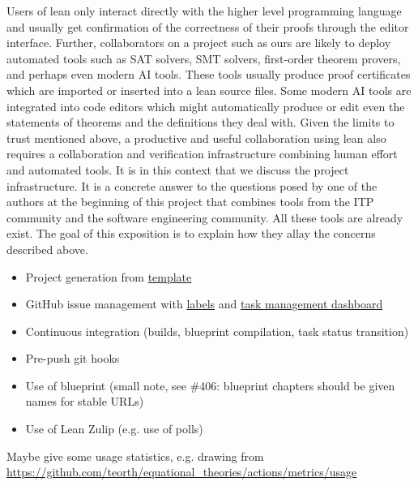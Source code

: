 Users of lean only interact directly with the higher level programming language and usually get confirmation of the correctness of their proofs through the editor interface. Further, collaborators on a project such as ours are likely to deploy automated tools such as SAT solvers, SMT solvers, first-order theorem provers, and perhaps even modern AI tools. These tools usually produce proof certificates which are imported or inserted into a lean source files. Some modern AI tools are integrated into code editors which might automatically produce or edit even the statements of theorems and the definitions they deal with. Given the limits to trust mentioned above, a productive and useful collaboration using lean also requires a collaboration and verification infrastructure combining human effort and automated tools. It is in this context that we discuss the project infrastructure. It is a concrete answer to the questions posed by one of the authors at the beginning of this project \cite{Tao_blog_Sep_2024} that combines tools from the ITP community and the software engineering community. All these tools are already exist. The goal of this exposition is to explain how they allay the concerns described above.

\begin{itemize}
    \item Project generation from \href{https://github.com/pitmonticone/LeanProject}{template}
    \item GitHub issue management with \href{https://github.com/teorth/equational_theories/labels}{labels} and \href{https://github.com/users/teorth/projects/1}{task management dashboard}
    \item Continuous integration (builds, blueprint compilation, task status transition)
    \item Pre-push git hooks
    \item Use of blueprint (small note, see \#406: blueprint chapters should be given names for stable URLs)
    \item Use of Lean Zulip (e.g. use of polls)
\end{itemize}

Maybe give some usage statistics, e.g. drawing from \url{https://github.com/teorth/equational_theories/actions/metrics/usage}

